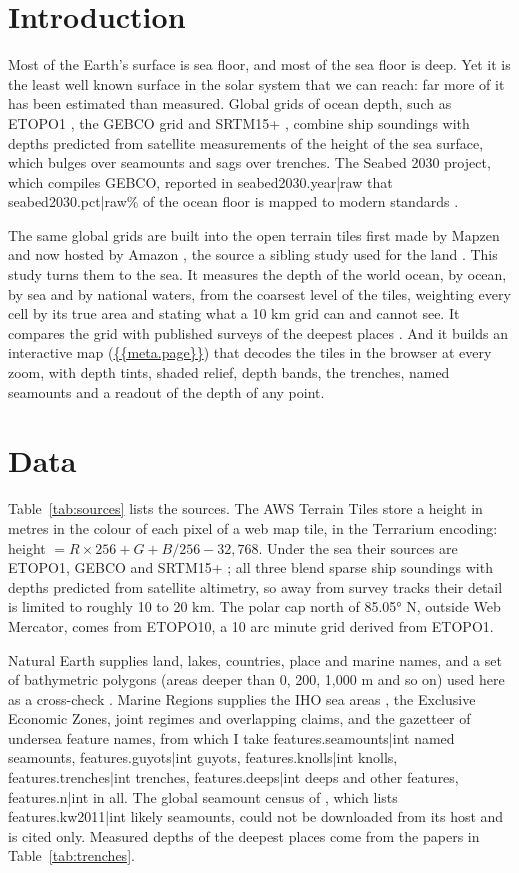 \documentclass[11pt,a4paper]{article}
\begin{document}
\section{Introduction}
Most of the Earth's surface is sea floor, and most of the sea floor is deep. Yet it is the least well known surface in the solar system that we can reach: far more of it has been estimated than measured. Global grids of ocean depth, such as ETOPO1 \citep{etopo1}, the GEBCO grid \citep{gebco} and SRTM15+ \citep{srtm15}, combine ship soundings with depths predicted from satellite measurements of the height of the sea surface, which bulges over seamounts and sags over trenches. The Seabed 2030 project, which compiles GEBCO, reported in {{seabed2030.year|raw}} that {{seabed2030.pct|raw}}\% of the ocean floor is mapped to modern standards \citep{seabed2030}.

The same global grids are built into the open terrain tiles first made by Mapzen and now hosted by Amazon \citep{terraintiles, joerd}, the source a sibling study used for the land \citep{worldterrain}. This study turns them to the sea. It measures the depth of the world ocean, by ocean, by sea and by national waters, from the coarsest level of the tiles, weighting every cell by its true area and stating what a 10 km grid can and cannot see. It compares the grid with published surveys of the deepest places \citep{greenaway, bongiovanni, stewart}. And it builds an interactive map (\url{{{meta.page}}}) that decodes the tiles in the browser at every zoom, with depth tints, shaded relief, depth bands, the trenches, named seamounts and a readout of the depth of any point.

\section{Data}
Table~\ref{tab:sources} lists the sources. The AWS Terrain Tiles store a height in metres in the colour of each pixel of a web map tile, in the Terrarium encoding: height $= R \times 256 + G + B/256 - 32{,}768$. Under the sea their sources are ETOPO1, GEBCO and SRTM15+ \citep{joerd}; all three blend sparse ship soundings with depths predicted from satellite altimetry, so away from survey tracks their detail is limited to roughly 10 to 20 km. The polar cap north of 85.05° N, outside Web Mercator, comes from ETOPO10, a 10 arc minute grid derived from ETOPO1.

Natural Earth supplies land, lakes, countries, place and marine names, and a set of bathymetric polygons (areas deeper than 0, 200, 1,000 m and so on) used here as a cross-check \citep{naturalearth}. Marine Regions supplies the IHO sea areas \citep{iho, marineregions}, the Exclusive Economic Zones, joint regimes and overlapping claims, and the gazetteer of undersea feature names, from which I take {{features.seamounts|int}} named seamounts, {{features.guyots|int}} guyots, {{features.knolls|int}} knolls, {{features.trenches|int}} trenches, {{features.deeps|int}} deeps and other features, {{features.n|int}} in all. The global seamount census of \citet{kw2011}, which lists {{features.kw2011|int}} likely seamounts, could not be downloaded from its host and is cited only. Measured depths of the deepest places come from the papers in Table~\ref{tab:trenches}.
\end{document}
